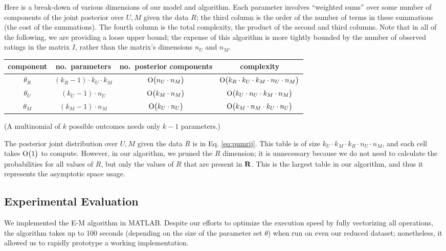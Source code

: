 \documentclass{article}
\begin{document}
Here is a break-down of various dimensions of our model and
algorithm. Each parameter involves ``weighted sums'' over some number
of components of the joint posterior over $U,M$ given the data $R$;
the third column is the order of the number of terms in these
summations (the cost of the summations). The fourth column is the
total complexity, the product of the second and third columns. Note
that in all of the following, we are providing a loose upper bound;
the expense of this algorithm is more tightly bounded by the number of
observed ratings in the matrix $I$, rather than the matrix's
dimensions $n_U$ and $n_M$.
\begin{center}
  \begin{tabular}{c|c|c|c}
    component & no.~parameters &
    no.~posterior components & complexity
    \\ \hline
    $\theta_R$ & $(k_R - 1) \cdot k_U \cdot k_M$ &
    $\operatorname{O}\bigl(n_U \cdot n_M\bigr)$ &
    $\operatorname{O}\bigl(k_R \cdot k_U \cdot k_M \cdot n_U \cdot n_M\bigr)$ \\
    $\theta_U$ & $(k_U - 1) \cdot n_U$ &
    $\operatorname{O}\bigl(k_M \cdot n_M\bigr)$ & $\operatorname{O}\bigl(k_U \cdot n_U \cdot k_M \cdot n_M\bigr)$ \\
    $\theta_M$ & $(k_M - 1) \cdot n_M$ &
    $\operatorname{O}\bigl(k_U \cdot n_U\bigr)$ & $\operatorname{O}\bigl(k_M \cdot n_M \cdot k_U \cdot n_U\bigr)$ \\
  \end{tabular}
\end{center}
(A multinomial of $k$ possible outcomes needs only $k-1$ parameters.)

The posterior joint distribution over $U,M$ given the data $R$ is in
Eq. \ref{eq:pumrij}. This table is of size $k_U \cdot k_M \cdot k_R
\cdot n_U \cdot n_M$, and each cell takes $\operatorname{O}\bigl(1\bigr)$ to
compute. However, in our algorithm, we pruned the $R$ dimension; it is
unnecessary because we do not need to calculate the probabilities for
all values of $R$, but only the values of $R$ that are present in
${\bf R}$. This is the largest table in our algorithm, and thus it
represents the asymptotic space usage.

\subsection{Experimental Evaluation}

We implemented the E-M algorithm in MATLAB. Despite our efforts to
optimize the execution speed by fully vectorizing all operations, the
algorithm takes up to 100 seconds (depending on the size of the
parameter set $\theta$) when run on even our reduced dataset;
nonetheless, it allowed us to rapidly prototype a working
implementation.
\end{document}
